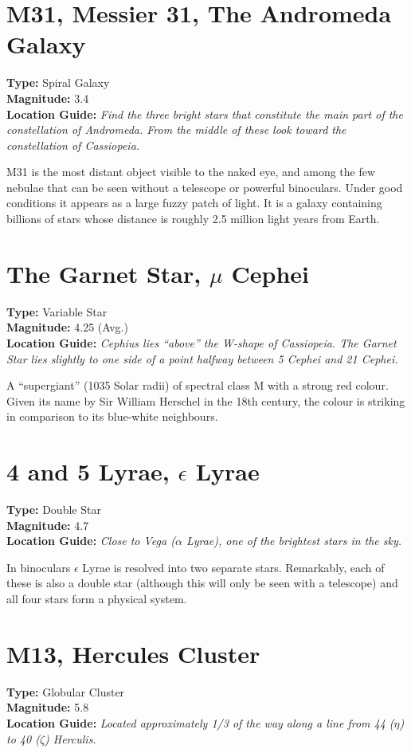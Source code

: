 \section{M31, Messier 31, The Andromeda Galaxy}
\textbf{Type:} Spiral Galaxy \\
\textbf{Magnitude:} 3.4 \\ 
\textbf{Location Guide:} \textit{Find the three bright stars that constitute the main part of the constellation of Andromeda. From the middle of these look toward the constellation of Cassiopeia.}

M31 is the most distant object visible to the naked eye, and among the
few nebulae that can be seen without a telescope or powerful
binoculars. Under good conditions it appears as a large fuzzy patch of
light. It is a galaxy containing billions of stars whose distance is
roughly 2.5 million light years from Earth.

\section{The Garnet Star, \texorpdfstring{$\mu$}{mu} Cephei}
\textbf{Type:} Variable Star \\
\textbf{Magnitude:} 4.25 (Avg.) \\
\textbf{Location Guide:} \textit{Cephius lies ``above'' the W-shape of
  Cassiopeia. The Garnet Star lies slightly to one side of a point
  halfway between 5 Cephei and 21 Cephei.}

A ``supergiant'' (1035 Solar radii) of spectral class M with a strong
red colour. Given its name by Sir William Herschel in the 18th
century, the colour is striking in comparison to its blue-white
neighbours.

\section{4 and 5 Lyrae, \texorpdfstring{$\epsilon$}{epsilon} Lyrae}
\textbf{Type:} Double Star \\
\textbf{Magnitude:} 4.7 \\
\textbf{Location Guide:} \textit{Close to Vega ($\alpha$ Lyrae), one of the brightest stars in the sky.}

In binoculars $\epsilon$ Lyrae is resolved into two separate
stars. Remarkably, each of these is also a double star (although this
will only be seen with a telescope) and all four stars form a physical
system.

\section{M13, Hercules Cluster} 
\textbf{Type:} Globular Cluster \\ 
\textbf{Magnitude:} 5.8 \\
\textbf{Location Guide:} \textit{Located approximately 1/3 of the way along a line from 44 ($\eta$) to 40 ($\zeta$) Herculis.}

